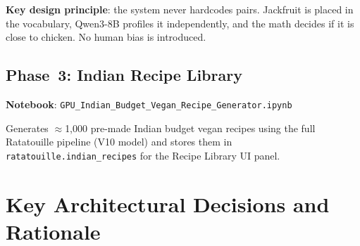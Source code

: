 \documentclass[12pt, a4paper]{article}
\begin{document}
\noindent\textbf{Key design principle}: the system never hardcodes pairs.  Jackfruit is placed
in the vocabulary, Qwen3-8B profiles it independently, and the math decides if it is close
to chicken.  No human bias is introduced.

\subsection{Phase~3: Indian Recipe Library}

\textbf{Notebook}: \texttt{GPU\_Indian\_Budget\_Vegan\_Recipe\_Generator.ipynb}

Generates $\approx$1,000 pre-made Indian budget vegan recipes using the full Ratatouille
pipeline (V10 model) and stores them in \texttt{ratatouille.indian\_recipes} for the
Recipe Library UI panel.

\section{Key Architectural Decisions and Rationale}
\end{document}
